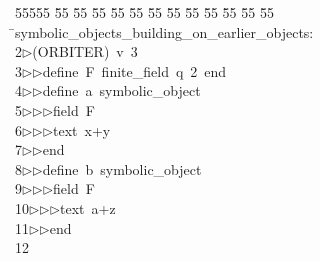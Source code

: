 %
%
\begin{tabbing}
55555 \= 55 \= 55 \= 55 \= 55 \= 55 \= 55 \= 55 \= 55 \= 55 \= 55 \= 55 \= 55 \= \>symbolic\_objects\_building\_on\_earlier\_objects:\\[0pt]
2\>$\triangleright$\>(ORBITER)\ v\ 3\ \\[0pt]
3\>$\triangleright$\>$\triangleright$\>define\ F\ finite\_field\ q\ 2\ end\ \\[0pt]
4\>$\triangleright$\>$\triangleright$\>define\ a\ symbolic\_object\ \\[0pt]
5\>$\triangleright$\>$\triangleright$\>$\triangleright$\>field\ F\ \\[0pt]
6\>$\triangleright$\>$\triangleright$\>$\triangleright$\>text\ x+y\\[0pt]
7\>$\triangleright$\>$\triangleright$\>end\ \\[0pt]
8\>$\triangleright$\>$\triangleright$\>define\ b\ symbolic\_object\ \\[0pt]
9\>$\triangleright$\>$\triangleright$\>$\triangleright$\>field\ F\ \\[0pt]
10\>$\triangleright$\>$\triangleright$\>$\triangleright$\>text\ a+z\\[0pt]
11\>$\triangleright$\>$\triangleright$\>end\\[0pt]
12\>\end{tabbing}
